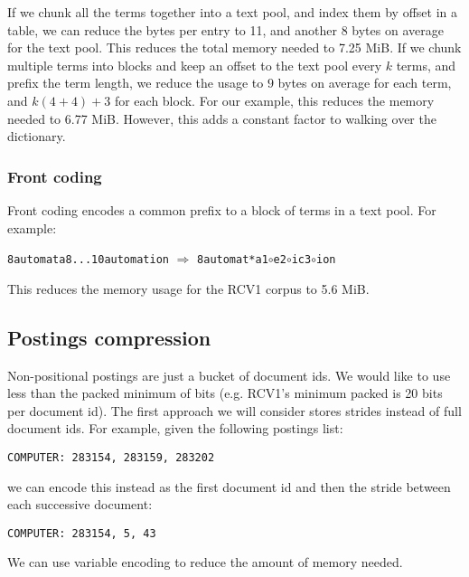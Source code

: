 \documentclass{idc_msc}
\begin{document}
If we chunk all the terms together into a text pool, and index them by offset in a table, we can reduce the bytes per entry to 11, and another 8 bytes on average for the text pool.
This reduces the total memory needed to 7.25 MiB.
If we chunk multiple terms into blocks and keep an offset to the text pool every \(k\) terms, and prefix the term length, we reduce the usage to \(9\) bytes on average for each term, and \(k (4 + 4) + 3\) for each block.
For our example, this reduces the memory needed to 6.77 MiB.
However, this adds a constant factor to walking over the dictionary.

\subsubsection{Front coding}

Front coding encodes a common prefix to a block of terms in a text pool.
For example:

\begin{center}
\texttt{8automata8...10automation} \(\Rightarrow\) \texttt{8automat*a1\(\circ\)e2\(\circ\)ic3\(\circ\)ion}
\end{center}

This reduces the memory usage for the RCV1 corpus to 5.6 MiB.


\subsection{Postings compression}

Non-positional postings are just a bucket of document ids.
We would like to use less than the packed minimum of bits (e.g. RCV1's minimum packed is 20 bits per document id).
The first approach we will consider stores strides instead of full document ids.
For example, given the following postings list:

\begin{center}
\texttt{COMPUTER: 283154, 283159, 283202}
\end{center}

we can encode this instead as the first document id and then the stride between each successive document:

\begin{center}
\texttt{COMPUTER: 283154, 5, 43}
\end{center}

We can use variable encoding to reduce the amount of memory needed.
\end{document}

